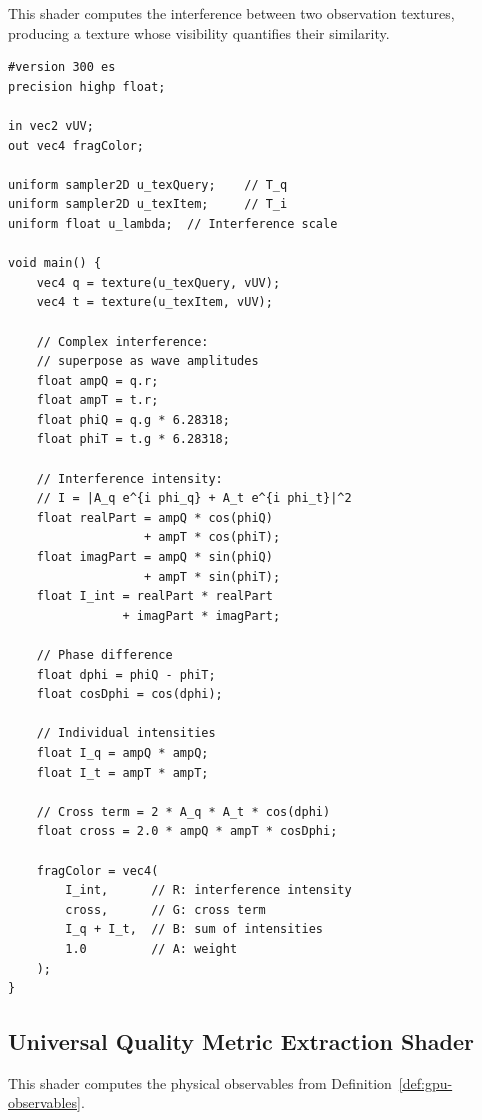 \documentclass[11pt,twocolumn,a4paper]{article}
\begin{document}
This shader computes the interference between two observation textures,
producing a texture whose visibility quantifies their similarity.

\begin{lstlisting}[style=glsl,caption={Universal Interference Shader}]
#version 300 es
precision highp float;

in vec2 vUV;
out vec4 fragColor;

uniform sampler2D u_texQuery;    // T_q
uniform sampler2D u_texItem;     // T_i
uniform float u_lambda;  // Interference scale

void main() {
    vec4 q = texture(u_texQuery, vUV);
    vec4 t = texture(u_texItem, vUV);

    // Complex interference:
    // superpose as wave amplitudes
    float ampQ = q.r;
    float ampT = t.r;
    float phiQ = q.g * 6.28318;
    float phiT = t.g * 6.28318;

    // Interference intensity:
    // I = |A_q e^{i phi_q} + A_t e^{i phi_t}|^2
    float realPart = ampQ * cos(phiQ)
                   + ampT * cos(phiT);
    float imagPart = ampQ * sin(phiQ)
                   + ampT * sin(phiT);
    float I_int = realPart * realPart
                + imagPart * imagPart;

    // Phase difference
    float dphi = phiQ - phiT;
    float cosDphi = cos(dphi);

    // Individual intensities
    float I_q = ampQ * ampQ;
    float I_t = ampT * ampT;

    // Cross term = 2 * A_q * A_t * cos(dphi)
    float cross = 2.0 * ampQ * ampT * cosDphi;

    fragColor = vec4(
        I_int,      // R: interference intensity
        cross,      // G: cross term
        I_q + I_t,  // B: sum of intensities
        1.0         // A: weight
    );
}
\end{lstlisting}

\subsection{Universal Quality Metric Extraction Shader}

This shader computes the physical observables from
Definition~\ref{def:gpu-observables}.
\end{document}
